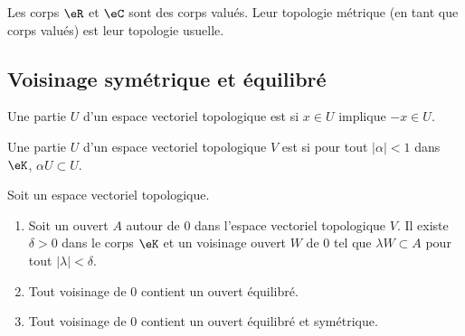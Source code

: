 \begin{lemma}       \label{LEMooCHDTooZsgXEK}
	Les corps \( \eR\) et \( \eC\) sont des corps valués. Leur topologie métrique (en tant que corps valués) est leur topologie usuelle.
\end{lemma}

\subsection{Voisinage symétrique et équilibré}

\begin{definition}
	Une partie \( U\) d'un espace vectoriel topologique est  si \( x\in U\) implique \( -x\in U\).
\end{definition}

\begin{definition}
	Une partie \( U\) d'un espace vectoriel topologique \( V\) est  si pour tout \( | \alpha |<1\) dans \( \eK\), \( \alpha U\subset U\).
\end{definition}

\begin{lemma}     \label{LEMooYSWXooNqAcOQ}
	Soit un espace vectoriel topologique.
	\begin{enumerate}
		\item       \label{ITEMooSWWQooTreWIE}
		      Soit un ouvert \( A\) autour de \( 0\) dans l'espace vectoriel topologique \( V\). Il existe \( \delta>0\) dans le corps \( \eK\) et un voisinage ouvert \(W\) de \( 0\) tel que \( \lambda W\subset A\) pour tout \( | \lambda |<\delta\).
		\item       \label{ITEMooXZNHooGVplpu}
		      Tout voisinage de \( 0\) contient un ouvert équilibré.
		\item       \label{ITEMooRLVSooGihcLc}
		      Tout voisinage de \( 0\) contient un ouvert équilibré et symétrique.
	\end{enumerate}
\end{lemma}

